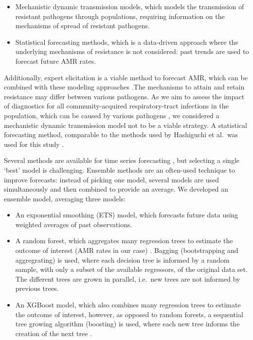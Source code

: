 \documentclass[
]{article}
\begin{document}
\begin{itemize}
\item
  Mechanistic dynamic transmission models, which models the transmission of resistant pathogens through populations, requiring information on the mechanisms of spread of resistant pathogens.
\item
  Statistical forecasting methods, which is a data-driven approach where the underlying mechanisms of resistance is not considered: past trends are used to forecast future AMR rates.
\end{itemize}

Additionally, expert elicitation is a viable method to forecast AMR, which can be combined with these modeling approaches \autocite{colsonQuantifyingUncertaintyFuture2019} .The mechanisms to attain and retain resistance may differ between various pathogens. As we aim to assess the impact of diagnostics for all community-acquired respiratory-tract infections in the population, which can be caused by various pathogens \autocite{ievenAetiologyLowerRespiratory2018} , we considered a mechanistic dynamic transmission model not to be a viable strategy. A statistical forecasting method, comparable to the methods used by Hashiguchi et al.~was used for this study \autocite{hashiguchiResistanceProportionsEight2019} .

Several methods are available for time series forecasting \autocite{hyndmanForecastingPrinciplesPractice2021,galiciaMultistepForecastingBig2019}, but selecting a single `best' model is challenging. Ensemble methods are an often-used technique to improve forecasts: instead of picking one model, several models are used simultaneously and then combined to provide an average. We developed an ensemble model, averaging three models:

\begin{itemize}
\item
  An exponential smoothing (ETS) model, which forecasts future data using weighted averages of past observations. \autocite{hyndmanForecastingPrinciplesPractice2021}
\item
  A random forest, which aggregates many regression trees to estimate the outcome of interest (AMR rates in our case) \autocite{breimanRandomForests2001}. Bagging (bootstrapping and aggregrating) is used, where each decision tree is informed by a random sample, with only a subset of the available regressors, of the original data set. The different trees are grown in parallel, i.e.~new trees are not informed by previous trees.
\item
  An XGBoost model, which also combines many regression trees to estimate the outcome of interest, however, as opposed to random forests, a sequential tree growing algorithm (boosting) is used, where each new tree informs the creation of the next tree \autocite{chenXGBoostScalableTree2016}.
\end{itemize}
\end{document}
